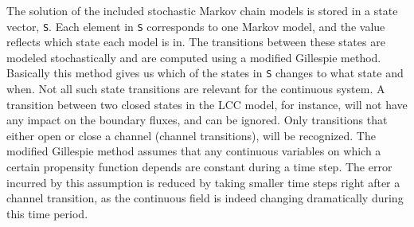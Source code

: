 The solution of the included stochastic Markov chain models is stored
in a state vector, \texttt{S}. Each element in \texttt{S} corresponds
to one Markov model, and the value reflects which state each model is
in. The transitions between these states are modeled stochastically
and are computed using a modified Gillespie method. Basically this
method gives us which of the states in \texttt{S} changes to what
state and when. Not all such state transitions are relevant for the
continuous system. A transition between two closed states in the LCC
model, for instance, will not have any impact on the boundary fluxes,
and can be ignored. Only transitions that either open or close a
channel (channel transitions), will be recognized. The modified
Gillespie method assumes that any continuous variables on which a
certain propensity function depends are constant during a time
step. The error incurred by this assumption is reduced by taking
smaller time steps right after a channel transition, as the continuous
field is indeed changing dramatically during this time period. \par

